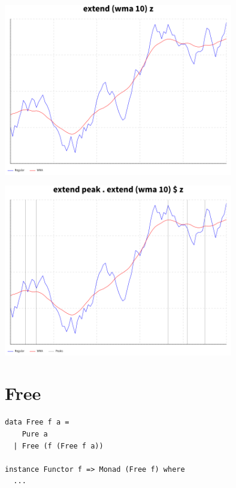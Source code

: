 \documentclass{beamer}
\begin{document}
\begin{frame}[fragile]
\begin{overprint}
\begin{center}
    \end{center}
    \begin{center}
    \includegraphics[width=0.75\textwidth]{graph4.png}
    \end{center}
    \begin{center}
    \includegraphics[width=0.75\textwidth]{graph5.png}
    \end{center}
\end{overprint}
\end{frame}

\section{Free}

\begin{frame}[fragile]
  \begin{verbatim}
data Free f a =
    Pure a
  | Free (f (Free f a))

instance Functor f => Monad (Free f) where
  ...
  \end{verbatim}
\end{frame}
\end{document}
